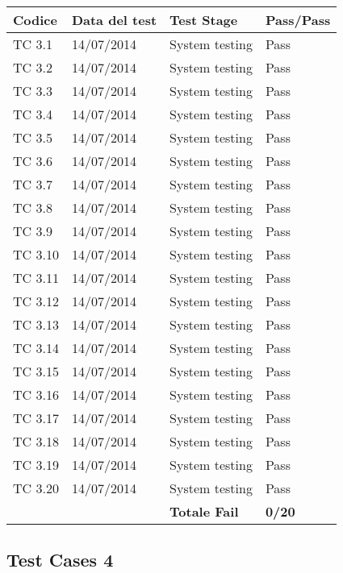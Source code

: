 \begin{tabular}{|p{3cm}|p{3cm}|p{3cm}|p{3cm}|}
	\hline
	\rowcolor{Gray}
	\textbf{Codice} & \textbf{Data del test} & \textbf{Test Stage} & \textbf{Pass/Pass}\tabularnewline
	\hline
	TC 3.1			& 14/07/2014 			& System testing		& Pass \tabularnewline
	\hline
	TC 3.2			& 14/07/2014 			& System testing		& Pass \tabularnewline
	\hline
	TC 3.3			& 14/07/2014 			& System testing		& Pass \tabularnewline
	\hline
	TC 3.4			& 14/07/2014 			& System testing		& Pass \tabularnewline
	\hline
	TC 3.5			& 14/07/2014 			& System testing		& Pass \tabularnewline
	\hline
	TC 3.6			& 14/07/2014 			& System testing		& Pass \tabularnewline
	\hline
	TC 3.7			& 14/07/2014 			& System testing		& Pass \tabularnewline
	\hline
	TC 3.8			& 14/07/2014 			& System testing		& Pass \tabularnewline
	\hline
	TC 3.9			& 14/07/2014 			& System testing		& Pass \tabularnewline
	\hline
	TC 3.10			& 14/07/2014 			& System testing		& Pass \tabularnewline
	\hline
	TC 3.11			& 14/07/2014 			& System testing		& Pass \tabularnewline
	\hline
	TC 3.12			& 14/07/2014 			& System testing		& Pass \tabularnewline
	\hline
	TC 3.13			& 14/07/2014 			& System testing		& Pass \tabularnewline
	\hline
	TC 3.14			& 14/07/2014 			& System testing		& Pass \tabularnewline
	\hline
	TC 3.15			& 14/07/2014 			& System testing		& Pass \tabularnewline
	\hline
	TC 3.16			& 14/07/2014 			& System testing		& Pass \tabularnewline
	\hline
	TC 3.17			& 14/07/2014 			& System testing		& Pass \tabularnewline
	\hline
	TC 3.18			& 14/07/2014 			& System testing		& Pass \tabularnewline
	\hline
	TC 3.19			& 14/07/2014 			& System testing		& Pass \tabularnewline
	\hline
	TC 3.20			& 14/07/2014 			& System testing		& Pass \tabularnewline
	\hline
					& 						& \textbf{Totale Fail}	& \textbf{0/20} \tabularnewline
	\hline
\end{tabular}

\subsection{Test Cases 4}

